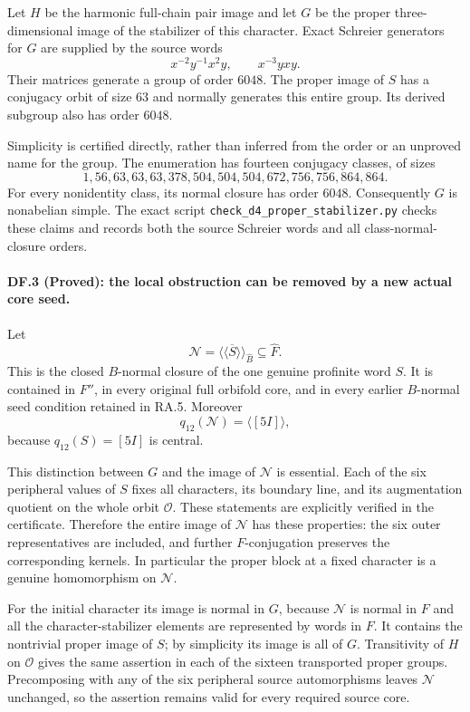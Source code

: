 Let $H$ be the harmonic full-chain pair image and let
$G$ be the proper three-dimensional image of the
stabilizer of this character.  Exact Schreier generators
for $G$ are supplied by the source words
\[
              x^{-2}y^{-1}x^2y,
              \qquad x^{-3}yxy.
\]
Their matrices generate a group of order $6048$.
The proper image of $S$ has a conjugacy orbit of size
$63$ and normally generates this entire group.
Its derived subgroup also has order $6048$.

Simplicity is certified directly, rather than inferred
from the order or an unproved name for the group.
The enumeration has fourteen conjugacy classes, of sizes
\[
 1,56,63,63,63,378,504,504,504,672,756,756,864,864.
\]
For every nonidentity class, its normal closure has
order $6048$.  Consequently $G$ is nonabelian simple.
The exact script
\texttt{check\_d4\_proper\_stabilizer.py} checks these
claims and records both the source Schreier words and
all class-normal-closure orders.

\paragraph{DF.3 (Proved): the local obstruction can be removed by a new actual core seed.}
Let
\[
            \mathcal N=\overline{\langle\!\langle S
                         \rangle\!\rangle}_{\widehat B}
                         \subseteq\widehat F.
\]
This is the closed $B$-normal closure of the one genuine
profinite word $S$.  It is contained in $F''$, in every
original full orbifold core, and in every earlier
$B$-normal seed condition retained in RA.5.  Moreover
\[
                     q_{12}(\mathcal N)=\langle[5I]\rangle,
\]
because $q_{12}(S)=[5I]$ is central.

This distinction between $G$ and the image of
$\mathcal N$ is essential.  Each of the six peripheral
values of $S$ fixes all characters, its boundary line,
and its augmentation quotient on the whole orbit
$\mathcal O$.  These statements are explicitly
verified in the certificate.  Therefore the entire
image of $\mathcal N$ has these properties: the six
outer representatives are included, and further
$F$-conjugation preserves the corresponding kernels.
In particular the proper block at a fixed character
is a genuine homomorphism on $\mathcal N$.

For the initial character its image is normal in $G$,
because $\mathcal N$ is normal in $F$ and all the
character-stabilizer elements are represented by words
in $F$.  It contains the nontrivial proper image of $S$;
by simplicity its image is all of $G$.  Transitivity
of $H$ on $\mathcal O$ gives the same assertion in
each of the sixteen transported proper groups.
Precomposing with any of the six peripheral source
automorphisms leaves $\mathcal N$ unchanged, so the
assertion remains valid for every required source core.

